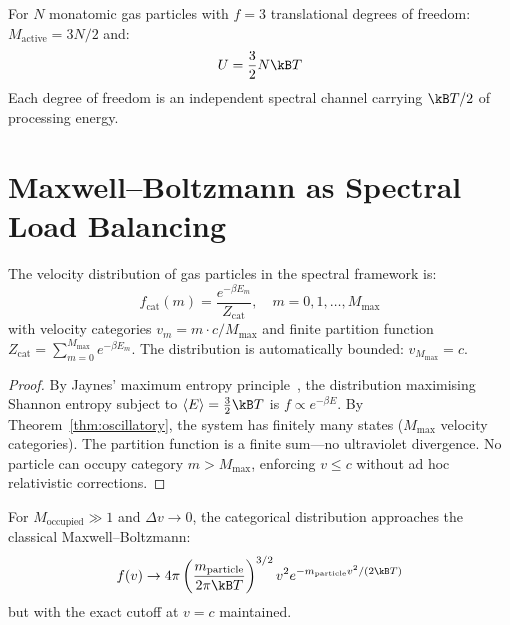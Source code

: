 \begin{corollary}[Equipartition]
For $N$ monatomic gas particles with $f = 3$ translational degrees of freedom: $M_{\mathrm{active}} = 3N/2$ and:
\begin{equation}
    U = \frac{3}{2}N\kB T
\end{equation}
Each degree of freedom is an independent spectral channel carrying $\kB T/2$ of processing energy.
\end{corollary}

\section{Maxwell--Boltzmann as Spectral Load Balancing}
\label{sec:maxwell_boltzmann}

\begin{theorem}
\label{thm:maxwell}
The velocity distribution of gas particles in the spectral framework is:
\begin{equation}
    f_{\mathrm{cat}}(m) = \frac{e^{-\beta E_m}}{Z_{\mathrm{cat}}}, \quad m = 0, 1, \ldots, M_{\max}
\end{equation}
with velocity categories $v_m = m \cdot c/M_{\max}$ and finite partition function $Z_{\mathrm{cat}} = \sum_{m=0}^{M_{\max}} e^{-\beta E_m}$. The distribution is automatically bounded: $v_{M_{\max}} = c$.
\end{theorem}

\begin{proof}
By Jaynes' maximum entropy principle~\cite{jaynes1957}, the distribution maximising Shannon entropy subject to $\langle E \rangle = \tfrac{3}{2}\kB T$ is $f \propto e^{-\beta E}$. By Theorem~\ref{thm:oscillatory}, the system has finitely many states ($M_{\max}$ velocity categories). The partition function is a finite sum---no ultraviolet divergence. No particle can occupy category $m > M_{\max}$, enforcing $v \leq c$ without ad hoc relativistic corrections.
\end{proof}

\begin{proposition}
For $M_{\mathrm{occupied}} \gg 1$ and $\Delta v \to 0$, the categorical distribution approaches the classical Maxwell--Boltzmann:
\begin{equation}
    f(v) \to 4\pi \left(\frac{m_{\mathrm{particle}}}{2\pi \kB T}\right)^{3/2} v^2 e^{-m_{\mathrm{particle}} v^2/(2\kB T)}
\end{equation}
but with the exact cutoff at $v = c$ maintained.
\end{proposition}

